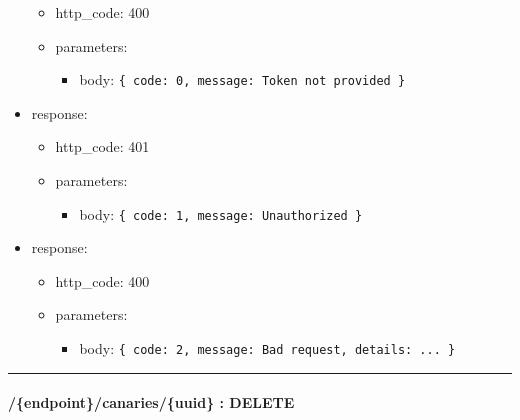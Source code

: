 \documentclass[
]{article}
\begin{document}
\begin{itemize}
  \begin{itemize}
  \item
    http\_code: 400
  \item
    parameters:

    \begin{itemize}
    \item
      body: \texttt{\{
      \textquotesingle{}code\textquotesingle{}:\ 0,\ 
      \textquotesingle{}message\textquotesingle{}:\ \textquotesingle{}Token\ not\ provided\textquotesingle{}
      \}}
    \end{itemize}
  \end{itemize}
\item
  response:

  \begin{itemize}
  \item
    http\_code: 401
  \item
    parameters:

    \begin{itemize}
    \item
      body: \texttt{\{
      \textquotesingle{}code\textquotesingle{}:\ 1,\ 
      \textquotesingle{}message\textquotesingle{}:\ \textquotesingle{}Unauthorized\textquotesingle{}
      \}}
    \end{itemize}
  \end{itemize}
\item
  response:

  \begin{itemize}
  \item
    http\_code: 400
  \item
    parameters:

    \begin{itemize}
    \item
      body: \texttt{\{
      \textquotesingle{}code\textquotesingle{}:\ 2,
      \textquotesingle{}message\textquotesingle{}:\ \textquotesingle{}Bad\ request\textquotesingle{},
      \textquotesingle{}details\textquotesingle{}:\ \textquotesingle{}...\textquotesingle{}
      \}}
    \end{itemize}
  \end{itemize}
\end{itemize}

\begin{center}\rule{0.5\linewidth}{0.5pt}\end{center}

\hypertarget{header-n61600}{%
\paragraph{/\{endpoint\}/canaries/\{uuid\} :
DELETE}\label{header-n61600}}
\end{document}
